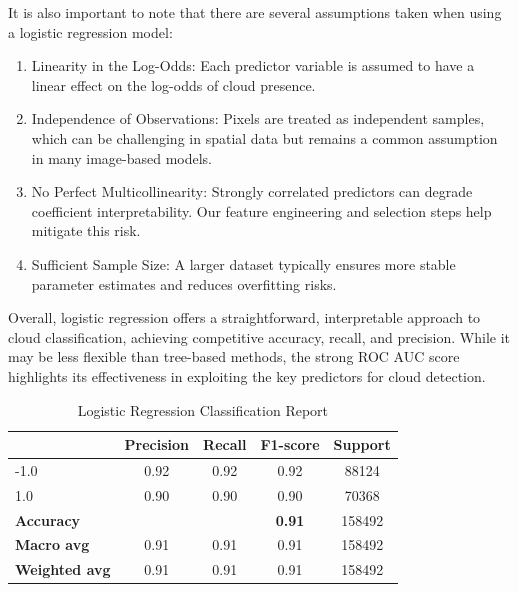 \documentclass[11pt,letterpaper]{article}
\begin{document}
It is also important to note that there are several assumptions taken when using a logistic regression model:
\begin{enumerate}
    \item  Linearity in the Log-Odds: Each predictor variable is assumed to have a linear effect on the log-odds of cloud presence.
    \item Independence of Observations: Pixels are treated as independent samples, which can be challenging in spatial data but remains a common assumption in many image-based models.
    \item No Perfect Multicollinearity: Strongly correlated predictors can degrade coefficient interpretability. Our feature engineering and selection steps help mitigate this risk.
    \item Sufficient Sample Size: A larger dataset typically ensures more stable parameter estimates and reduces overfitting risks.
\end{enumerate}

Overall, logistic regression offers a straightforward, interpretable approach to cloud classification, achieving competitive accuracy, recall, and precision. While it may be less flexible than tree-based methods, the strong ROC AUC score highlights its effectiveness in exploiting the key predictors for cloud detection.

\begin{table}[H]
\centering
\begin{tabular}{lcccc}
\hline
\textbf{} & \textbf{Precision} & \textbf{Recall} & \textbf{F1-score} & \textbf{Support} \\
\hline
-1.0 & 0.92 & 0.92 & 0.92 & 88124 \\
1.0 & 0.90 & 0.90 & 0.90 & 70368 \\
\hline
\textbf{Accuracy} & & & \textbf{0.91} & 158492 \\
\textbf{Macro avg} & 0.91 & 0.91 & 0.91 & 158492 \\
\textbf{Weighted avg} & 0.91 & 0.91 & 0.91 & 158492 \\
\hline
\end{tabular}
\caption{Logistic Regression Classification Report}
\label{tab:classification_report2}
\end{table}
\end{document}
